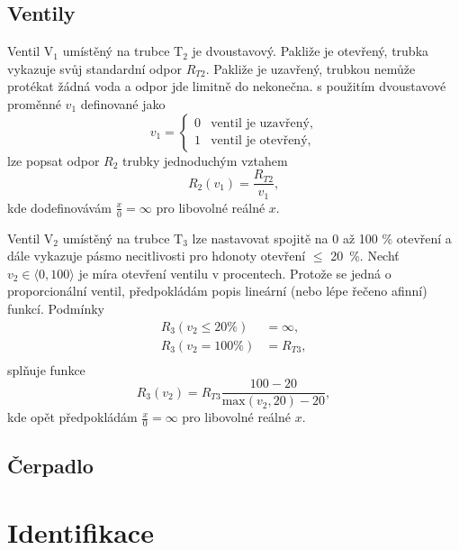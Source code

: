 \documentclass[twoside]{article}
\begin{document}
\subsection{Ventily}
\label{sec:ventily}

Ventil $\text{V}_1$ umístěný na trubce $\text{T}_2$ je dvoustavový. Pakliže je otevřený, trubka vykazuje svůj standardní odpor $R_{T2}$.
Pakliže je uzavřený, trubkou nemůže protékat žádná voda a odpor jde limitně do nekonečna. s použitím dvoustavové proměnné $v_1$ definované jako
\begin{equation}
    v_1 = \begin{cases} 
        0 & \text{ventil je uzavřený}, \\
        1 & \text{ventil je otevřený},
     \end{cases}
\end{equation}
lze popsat odpor $R_2$ trubky jednoduchým vztahem
\begin{equation}
    R_2(v_1) = \frac{R_{T2}}{v_1},
\end{equation}
kde dodefinovávám $\frac{x}{0} = \infty$ pro libovolné reálné $x$.

Ventil $\text{V}_2$ umístěný na trubce $\text{T}_3$ lze nastavovat spojitě na 0 až 100 \% otevření a dále vykazuje pásmo necitlivosti
pro hdonoty otevření $\le$ 20~\%.
Nechť $v_2 \in \langle 0, 100 \rangle $ je míra otevření ventilu v procentech. Protože se jedná o proporcionální ventil,
předpokládám popis lineární (nebo lépe řečeno afinní) funkcí. Podmínky
\begin{equation}
    \begin{split}
        R_3(v_2\le20\%) &= \infty, \\
        R_3(v_2=100\%) &= R_{T3},\\        
    \end{split}
\end{equation}
splňuje funkce
\begin{equation}
    R_3(v_2) = R_{T3} \frac{100-20}{\text{max}(v_2, 20) - 20},
\end{equation}
kde opět předpokládám $\frac{x}{0} = \infty$ pro libovolné reálné $x$.

\subsection{Čerpadlo}


\section{Identifikace}
\end{document}
